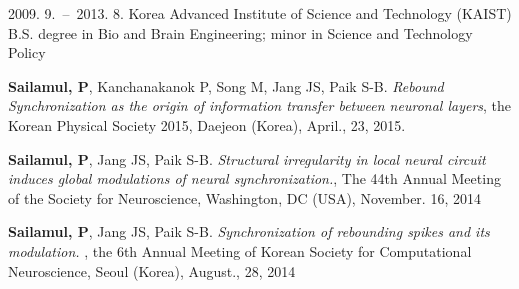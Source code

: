 \documentclass[master,english,final]{kaist-ucs}
\begin{document}
    \begin{education}
        \item[2009. 9.\ --\ 2013. 8.] Korea Advanced Institute of Science and Technology (KAIST) \newline
        B.S. degree in Bio and Brain Engineering; minor in Science and Technology Policy \\	
    \end{education}


    \begin{activity}
     \item \textbf{Sailamul,  P},  Kanchanakanok P, Song M, Jang JS, Paik S-B. 
             \textit{Rebound Synchronization as the origin of information transfer between neuronal layers}, the Korean Physical Society 2015, Daejeon (Korea), April., 23, 2015.                
        \item  \textbf{Sailamul, P}, Jang JS, Paik S-B.          
        \textit{Structural irregularity in local neural circuit induces global modulations of neural synchronization.}, The 44th Annual Meeting of the Society for Neuroscience, Washington, DC (USA), November. 16, 2014 \\
        \item \textbf{Sailamul,  P}, Jang JS, Paik S-B.  
         \textit{Synchronization of rebounding spikes and its modulation. }, the 6th Annual Meeting of Korean Society for Computational Neuroscience, Seoul (Korea), August., 28, 2014 \\
    
    \end{activity}
\end{document}
